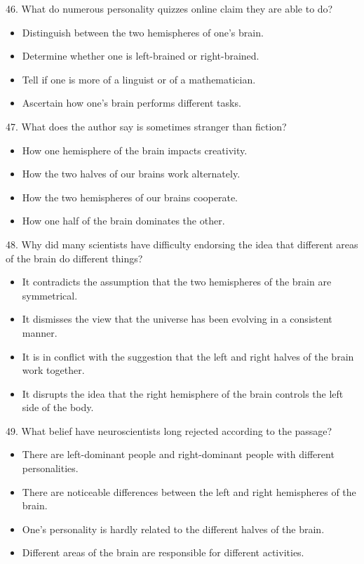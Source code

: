 \documentclass[UTF8,11pt]{ctexart}
\begin{document}
46. What do numerous personality quizzes online claim they are able to do?


\begin{itemize}[leftmargin=2em,itemsep=.2em,topsep=.4em]\item[A.] Distinguish between the two hemispheres of one’s brain.
\item[B.] Determine whether one is left-brained or right-brained.
\item[C.] Tell if one is more of a linguist or of a mathematician.
\item[D.] Ascertain how one’s brain performs different tasks.
\end{itemize}

47. What does the author say is sometimes stranger than fiction?


\begin{itemize}[leftmargin=2em,itemsep=.2em,topsep=.4em]\item[A.] How one hemisphere of the brain impacts creativity.
\item[B.] How the two halves of our brains work alternately.
\item[C.] How the two hemispheres of our brains cooperate.
\item[D.] How one half of the brain dominates the other.
\end{itemize}

48. Why did many scientists have difficulty endorsing the idea that different areas of the brain do different things?


\begin{itemize}[leftmargin=2em,itemsep=.2em,topsep=.4em]\item[A.] It contradicts the assumption that the two hemispheres of the brain are symmetrical.
\item[B.] It dismisses the view that the universe has been evolving in a consistent manner.
\item[C.] It is in conflict with the suggestion that the left and right halves of the brain work together.
\item[D.] It disrupts the idea that the right hemisphere of the brain controls the left side of the body.
\end{itemize}

49. What belief have neuroscientists long rejected according to the passage?


\begin{itemize}[leftmargin=2em,itemsep=.2em,topsep=.4em]\item[A.] There are left-dominant people and right-dominant people with different personalities.
\item[B.] There are noticeable differences between the left and right hemispheres of the brain.
\item[C.] One’s personality is hardly related to the different halves of the brain.
\item[D.] Different areas of the brain are responsible for different activities.
\end{itemize}
\end{document}
